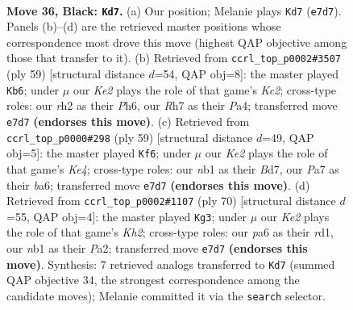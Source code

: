 \documentclass[11pt]{article}
\begin{document}
\clearpage

\begin{figure}[p]\centering
\begin{subfigure}{0.46\textwidth}\centering
\resizebox{\linewidth}{!}{%
\newchessgame
\chessboard[
  setfen={2r5/p1p1kp1r/P1p1b1p1/2P4p/1P3P1P/8/7R/RN2K3 b Q - 1 36},
  showmover=false,
  pgfstyle=straightmove, color=movearrow, markmove={e7-d7}
]}
\caption{}
\end{subfigure}\hfill
\begin{subfigure}{0.46\textwidth}\centering
\resizebox{\linewidth}{!}{%
\newchessgame
\chessboard[
  setfen={r7/1pk2pp1/2b1p2p/4P3/p1P2P1P/K1PB2P1/8/3R4 b - - 6 30},
  showmover=false,
  pgfstyle=straightmove, color=movearrow, markmove={c7-b6}
]}
\caption{}
\end{subfigure}
\\[4pt]
\begin{subfigure}{0.46\textwidth}\centering
\resizebox{\linewidth}{!}{%
\newchessgame
\chessboard[
  setfen={8/p1rb4/B1p1p3/4kpp1/PP6/4RPP1/2P5/2K5 b - - 1 30},
  showmover=false,
  pgfstyle=straightmove, color=movearrow, markmove={e5-f6}
]}
\caption{}
\end{subfigure}\hfill
\begin{subfigure}{0.46\textwidth}\centering
\resizebox{\linewidth}{!}{%
\newchessgame
\chessboard[
  setfen={6k1/p2r1p2/1p1p1Bnp/3P4/2PN2P1/1P5P/P4R1K/3r4 w - - 0 36},
  showmover=false,
  pgfstyle=straightmove, color=movearrow, markmove={h2-g3}
]}
\caption{}
\end{subfigure}
\caption{\textbf{Move 36, Black: \texttt{Kd7}.} (a) Our position; Melanie plays \texttt{Kd7} (\texttt{e7d7}). Panels (b)--(d) are the retrieved master positions whose correspondence most drove this move (highest QAP objective among those that transfer to it). (b) Retrieved from \texttt{ccrl\_top\_p0002\#3507} (ply 59) [structural distance $d$=54, QAP obj=8]: the master played \texttt{Kb6}; under $\mu$ our \emph{Ke2} plays the role of that game's \emph{Kc2}; cross-type roles: our \emph{r}h2 as their \emph{P}h6, our \emph{R}h7 as their \emph{P}a4; transferred move \texttt{e7d7} \textbf{(endorses this move)}. (c) Retrieved from \texttt{ccrl\_top\_p0000\#298} (ply 59) [structural distance $d$=49, QAP obj=5]: the master played \texttt{Kf6}; under $\mu$ our \emph{Ke2} plays the role of that game's \emph{Ke4}; cross-type roles: our \emph{n}b1 as their \emph{B}d7, our \emph{P}a7 as their \emph{b}a6; transferred move \texttt{e7d7} \textbf{(endorses this move)}. (d) Retrieved from \texttt{ccrl\_top\_p0002\#1107} (ply 70) [structural distance $d$=55, QAP obj=4]: the master played \texttt{Kg3}; under $\mu$ our \emph{Ke2} plays the role of that game's \emph{Kh2}; cross-type roles: our \emph{p}a6 as their \emph{r}d1, our \emph{n}b1 as their \emph{P}a2; transferred move \texttt{e7d7} \textbf{(endorses this move)}. Synthesis: 7 retrieved analogs transferred to \texttt{Kd7} (summed QAP objective 34, the strongest correspondence among the candidate moves); Melanie committed it via the \texttt{search} selector.}
\label{fig:thought-m71}
\end{figure}
\end{document}
